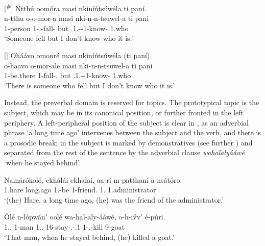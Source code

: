 \documentclass[output=paper]{langscibook}
\begin{document}
\ea
[\textsuperscript{\#}]{
\'{N}tthú oomóra masi nkiníńtsúwéla ti paní.\\
\gll
n-tthu  o-o-mor-a  masi  nki-n-n-tsuwel-a  ti  pani\\
1-person  1\SM{}-\PFV{}.\DJ{}-fall-\FV{}  but  \NEG{}.1\SG{}.\SM{}-\PRS{}-1\OM{}-know-\FV{}  \COP{}  1.who\\
\glt
‘Someone fell but I don’t know who it is.’\\
}

\z

\ea
[]{
\label{bkm:Ref129154547}
Oháávo omonré masi nkiníńtsúwéla (ti paní).\\
\gll
o-haavo  o-mor-ale  masi  nki-n-n-tsuwel-a  ti  pani\\
1\SM{}-be.there  1-fall-\PFV{}.\REL{}  but  \NEG{}.1\SG{}.\SM{}-\PRS{}-1\OM{}-know-\FV{}  \COP{}  1.who\\
\glt
‘There is someone who fell but I don’t know who it is.’\\
}


\z

Instead, the preverbal domain is reserved for topics. The prototypical topic is the subject, which may be in its canonical position, or further fronted in the left periphery. A left-peripheral position of the subject is clear in , as an adverbial phrase ‘a long time ago’ intervenes between the subject and the verb, and there is a prosodic break; in  the subject is marked by demonstratives (see further ) and separated from the rest of the sentence by the adverbial clause \textit{wahalalyááwé} ‘when he stayed behind’.

\ea
\label{bkm:Ref95912732}
\gll
Namárókoló,  ekhálái  ekhalaí,  aa-rí  m-patthaní  a  nsátóro.\\
1.hare  long.ago  \RED{}  1\SM{}.\PST{}-be  1-friend.\PRL{}  1.\CONN{}  1.administrator\\
\glt
‘(the) Hare, a long time ago, (he) was the friend of the administrator.’ \citep[183]{vanderWal2009a}\\

\z

\ea
\label{bkm:Ref95912734}
\gll
Ólé  n-lópwán’  oolé  wa-hal-aly-ááwé,   o-h-i\'{v}v’  é-púri. \\
1.\DEM{}.\DIST{}  1-man  1.\DEM{}.\DIST{}  16-stay-\PFV{}.\REL{}-\POSS{}.1   1\SM{}-\PFV{}.\DJ{}-kill  9-goat \\
\glt
‘That man, when he stayed behind, (he) killed a goat.’\\
\end{document}
